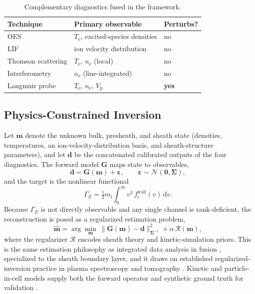 \documentclass[conference]{IEEEtran}
\newcommand{\Te}{T_{\mathrm{e}}}
\newcommand{\GammaE}{\Gamma_{E}}
\begin{document}
\begin{table}[t]
\caption{Complementary diagnostics fused in the framework.}
\label{tab:diag}
\centering
\footnotesize
\begin{tabular}{@{}lll@{}}
\toprule
\textbf{Technique} & \textbf{Primary observable} & \textbf{Perturbs?} \\
\midrule
OES & $\Te$, excited-species densities & no \\
LIF & ion velocity distribution & no \\
Thomson scattering & $\Te$, $n_{\mathrm{e}}$ (local) & no \\
Interferometry & $n_{\mathrm{e}}$ (line-integrated) & no \\
Langmuir probe & $\Te$, $n_{\mathrm{e}}$, $V_{\mathrm{p}}$ & \textbf{yes} \\
\bottomrule
\end{tabular}
\end{table}

\subsection{Physics-Constrained Inversion}
Let $\mathbf{m}$ denote the unknown bulk, presheath, and sheath state (densities, temperatures, an ion-velocity-distribution basis, and sheath-structure parameters), and let $\mathbf{d}$ be the concatenated calibrated outputs of the four diagnostics. The forward model $\mathbf{G}$ maps state to observables,
\begin{equation}
\mathbf{d} = \mathbf{G}(\mathbf{m}) + \boldsymbol{\varepsilon}, \qquad \boldsymbol{\varepsilon}\sim\mathcal{N}(\mathbf{0},\boldsymbol{\Sigma}),
\end{equation}
and the target is the nonlinear functional
\begin{equation}
\GammaE = \tfrac{1}{2} m_{\mathrm{i}} \int_{0}^{\infty} v^{3}\, f_{\mathrm{i}}^{\mathrm{wall}}(v)\,\mathrm{d}v .
\end{equation}
Because $\GammaE$ is not directly observable and any single channel is rank-deficient, the reconstruction is posed as a regularized estimation problem,
\begin{equation}
\hat{\mathbf{m}} = \arg\min_{\mathbf{m}}\ \big\lVert \mathbf{G}(\mathbf{m})-\mathbf{d}\big\rVert_{\boldsymbol{\Sigma}^{-1}}^{2} + \alpha\, \mathcal{R}(\mathbf{m}),
\end{equation}
where the regularizer $\mathcal{R}$ encodes sheath theory and kinetic-simulation priors. This is the same estimation philosophy as integrated data analysis in fusion \cite{ref0706,ref0707}, specialized to the sheath boundary layer, and it draws on established regularized-inversion practice in plasma spectroscopy and tomography \cite{ref0677,ref0678}. Kinetic and particle-in-cell models supply both the forward operator and synthetic ground truth for validation \cite{ref0631,ref0632,ref0660}.
\end{document}
